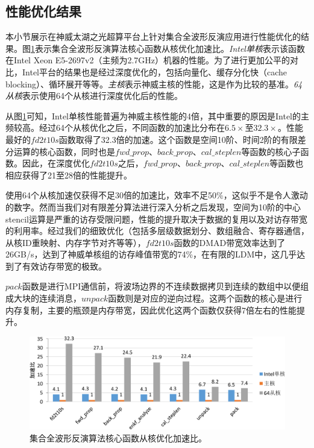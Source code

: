 \documentclass[degree=doctor]{thuthesis}
\begin{document}
\subsection{性能优化结果}

本小节展示在神威太湖之光超算平台上针对集合全波形反演应用进行性能优化的结果。图\ref{fig:集合全波形反演算法核心函数从核优化加速比}表示集合全波形反演算法核心函数从核优化加速比。\emph{Intel单核}表示该函数在Intel Xeon E5-2697v2（主频为2.7GHz）机器的性能。为了进行更加公平的对比，Intel平台的结果也是经过深度优化的，包括向量化、缓存分化快（cache blocking）、循环展开等等。\emph{主核}表示神威主核的性能，这是作为比较的基准。\emph{64从核}表示使用64个从核进行深度优化后的性能。

从图\ref{fig:集合全波形反演算法核心函数从核优化加速比}可知，Intel单核性能普遍为神威主核性能的4倍，其中重要的原因是Intel的主频较高。经过64个从核优化之后，不同函数的加速比分布在$6.5\times$至$32.3\times$。性能最好的$fd2t10s$函数取得了32.3倍的加速。这个函数是空间10阶、时间2阶的有限差分运算的核心函数，同时也是$fwd\_prop$、$back\_prop$、$cal\_steplen$等函数的核心子函数。因此，在深度优化$fd2t10s$之后，$fwd\_prop$、$back\_prop$、$cal\_steplen$等函数也相应获得了21至28倍的性能提升。

使用64个从核加速仅获得不足30倍的加速比，效率不足50\%，这似乎不是令人激动的数字。然而当我们对有限差分算法进行深入分析之后发现，空间为10阶的中心stencil运算是严重的访存受限问题，性能的提升取决于数据的复用以及对访存带宽的利用率。经过我们的细致优化（包括多层级数据划分、数组融合、寄存器通信，从核ID重映射、内存字节对齐等等），$fd2t10s$函数的DMAD带宽效率达到了26GB/s，达到了神威单核组的访存峰值带宽的74\%，在有限的LDM中，这几乎达到了有效访存带宽的极致。

$pack$函数是进行MPI通信前，将波场边界的不连续数据拷贝到连续的数组中以便组成大块的连续消息，$unpack$函数则是对应的逆向过程。这两个函数的核心是进行内存复制，主要的瓶颈是内存带宽，因此优化这两个函数仅获得7倍左右的性能提升。

\begin{figure}[ht]
\centering
\includegraphics[width=0.9\columnwidth]{enfwi不同函数优化加速比-crop.pdf}
\caption{集合全波形反演算法核心函数从核优化加速比。}
\label{fig:集合全波形反演算法核心函数从核优化加速比}
\end{figure}
\end{document}
